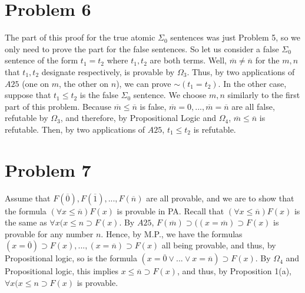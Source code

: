 \documentclass{article}
\newcommand*{\oldneg}{\mathord{\sim}}
\theoremstyle{definition}
\begin{document}
\section*{Problem 6}  
The part of this proof for the true atomic $\Sigma_0$ sentences was just Problem 5, so we only need to prove the part for the false sentences.\newline 
So let us consider a false $\Sigma_0$ sentence of the form $t_1=t_2$ where $t_1, t_2$ are both terms. Well, $\overline m\ne \overline n$ for the $m, n$ that 
$t_1, t_2$ designate respectively, is provable by $\Omega_3$. Thus, by two applications of $A25$ (one on $m$, the other on $n$), we can prove $\oldneg (t_1 =
t_2)$. In the other case, suppose that $t_1\le t_2$ is the false $\Sigma_0$ sentence. We choose $m, n$ similarly to the first part of this problem. Because 
$\overline m\le \overline n$ is false, $\overline m=0,...,\overline m=\overline n$ are all false, refutable by $\Omega_3$, and therefore, by Propositional 
Logic and $\Omega_4$, $\overline m\le \overline n$ is refutable. Then, by two applications of $A25$, $t_1\le t_2$ is refutable.  
\section*{Problem 7}
Assume that $F(\overline 0),F(\overline 1),...,F(\overline n)$ are all provable, and we are to show that the formula $(\forall x\le \overline n)F(x)$ is 
provable in PA. Recall that $(\forall x\le \overline n)F(x)$ is the same as $\forall x(x\le n\supset F(x)$. By $A25$, $F(\overline m)\supset ((x=\overline m
)\supset F(x)$ is provable for any number $n$. Hence, by M.P., we have the formulas $(x=\overline 0)\supset F(x),...,(x=\overline n)\supset F(x)$ all 
being provable, and thus, by Propositional logic, so is the formula $(x=\overline 0\vee ...\vee x=\overline n)\supset F(x)$. By $\Omega_4$ and Propositional 
logic, this implies $x\le \overline n\supset F(x)$, and thus, by Proposition 1(a), $\forall x(x\le n\supset F(x)$ is provable.\newline 
\end{document}
